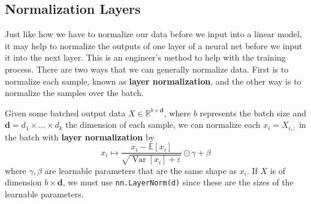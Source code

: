 \documentclass{article}
\DeclareMathOperator{\Var}{Var}
\begin{document}
\subsection{Normalization Layers} 

  Just like how we have to normalize our data before we input into a linear model, it may help to normalize the outputs of one layer of a neural net before we input it into the next layer. This is an engineer's method to help with the training process. There are two ways that we can generally normalize data. First is to normalize each sample, known as \textbf{layer normalization}, and the other way is to normalize the samples over the batch. 

  \begin{definition}
    Given some batched output data $X \in \mathbb{R}^{b \times \mathbf{d}}$, where $b$ represents the batch size and $\mathbf{d} = d_1 \times \ldots \times d_k$ the dimension of each sample, we can normalize each $x_i = X_{i, :}$ in the batch with \textbf{layer normalization} by 
    \begin{equation}
      x_i \mapsto \frac{x_i - \mathbb{E}[x_i]}{\sqrt{\Var[x_i] + \varepsilon}} \odot \gamma + \beta
    \end{equation}
    where $\gamma, \beta$ are learnable parameters that are the same shape as $x_i$. If $X$ is of dimension $b \times \mathbf{d}$, we must use \texttt{nn.LayerNorm(d)} since these are the sizes of the learnable parameters. 
  \end{definition}
\end{document}

